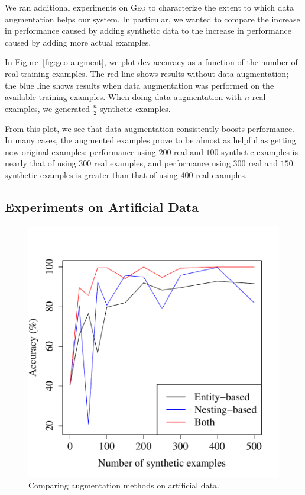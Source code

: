 \documentclass[11pt,letterpaper]{article}
\newcommand{\geo}{\textsc{Geo}\xspace}
\begin{document}
We ran additional experiments on \geo to characterize
the extent to which data augmentation helps our system.
In particular, we wanted to compare the increase in performance
caused by adding synthetic data to the 
increase in performance caused by adding more actual examples.

In Figure~\ref{fig:geo-augment}, we plot dev accuracy as a function of
the number of real training examples.  
The red line shows results without data augmentation;
the blue line shows results when data augmentation was 
performed on the available training examples.
When doing data augmentation with $n$ real examples,
we generated $\frac{n}2$ synthetic examples.

From this plot, we see that data augmentation consistently boosts performance.
In many cases, the augmented examples prove to be
almost as helpful as getting new original examples:
performance using $200$ real and $100$ synthetic examples
is nearly that of using $300$ real examples,
and performance using $300$ real and $150$ synthetic examples 
is greater than that of using $400$ real examples.

\subsection{Experiments on Artificial Data}
\begin{figure}[t] 
\small
\begin{center} 
  \includegraphics[scale=0.5]{fig-artificial-aug.pdf}
\end{center} 
\caption{Comparing augmentation methods on artificial data.}
\label{fig:artificial}
\end{figure}
\end{document}
